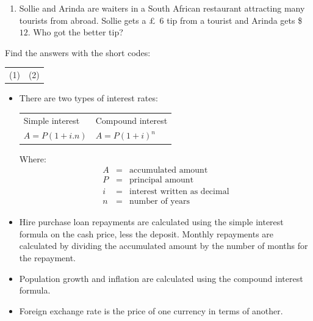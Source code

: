 \begin{exercises}{}
{\begin{enumerate}[itemsep=6pt, label=\textbf{\arabic*}.]
\begin{enumerate}[noitemsep, label=\textbf{(\alph*)} ]
	    \item Sollie and Arinda are waiters in a South African restaurant attracting many tourists from abroad. Sollie gets a £~$6$ tip from a tourist and Arinda gets \$~$12$. Who got the better tip?
	\end{enumerate}
    \end{enumerate}

    Find the answers with the short codes:\\
    \begin{tabularx}{\textwidth}{ XX }
	(1)	&	(2)\\
    \end{tabularx}
}
\end{exercises}


\summary

\begin{itemize}
    \item There are two types of interest rates:\\
    
    \begin{tabularx}{\textwidth}{ XX }
	Simple	interest &	Compound interest\\
	$A = P (1 + i . n)$	&	$A = P(1 + i)^n$\\
    \end{tabularx}
    \par
    Where:
    \begin{eqnarray*}
	A &=& \text{accumulated amount}\\
	P &=& \text{principal amount}\\
	i &=& \text{interest written as decimal}\\
	n &=& \text{number of years}
    \end{eqnarray*}

    \item Hire purchase loan repayments are calculated using the simple interest formula on the cash price, less the deposit.  Monthly repayments are calculated by dividing the accumulated amount by the number of months for the repayment.

    \item Population growth and inflation are calculated using the compound interest formula.

    \item Foreign exchange rate is the price of one currency in terms of another.
\end{itemize}


